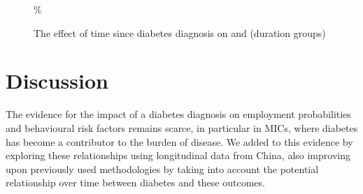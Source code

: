 \begin{landscape}
\begin{figure}
\DIFaddendFL \end{figure}
\begin{figure}
\begin{center}
\caption{\DIFdelbeginFL %
\DIFdelendFL \DIFaddbeginFL \label{fig:duration_g_fe_mi} \DIFaddendFL The effect of time since diabetes diagnosis on \DIFdelbeginFL {}\DIFdelendFL \DIFaddbeginFL {}\DIFaddendFL and \DIFdelbeginFL {}\DIFdelendFL \DIFaddbeginFL {}\DIFaddendFL (duration groups\DIFdelbeginFL {}\DIFdelendFL )}
\DIFdelbeginFL %
\DIFdelendFL \DIFaddbeginFL {}\DIFaddendFL \end{center}
\DIFaddbeginFL \footnotesize\textit{} \% 

\DIFaddendFL \end{figure}
\end{landscape}


\section{\label{sec:Discussion5}Discussion}

The evidence for the impact of a diabetes diagnosis on employment probabilities and behavioural risk factors remains scarce, in particular in \acp{MIC}, where diabetes has become a \DIFdelbegin {}\DIFdelend \DIFaddbegin {}\DIFaddend contributor to the burden of disease. We added to this evidence by exploring these relationships using longitudinal data from China, also improving upon previously used methodologies by taking into account the potential relationship over time between diabetes and these outcomes.

